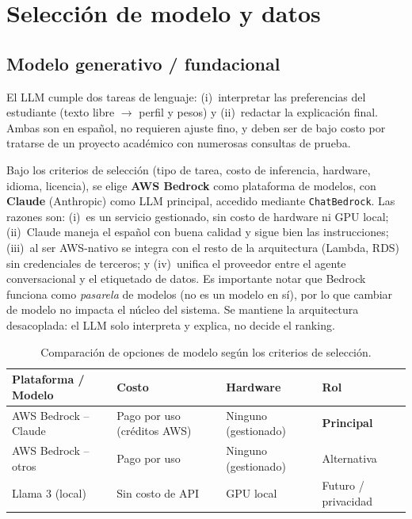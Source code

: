 \section{Selecci\'on de modelo y datos}
\label{sec:model-data}

\subsection{Modelo generativo / fundacional}

El LLM cumple dos tareas de lenguaje: (i)~interpretar las preferencias del
estudiante (texto libre $\rightarrow$ perfil y pesos) y (ii)~redactar la
explicaci\'on final. Ambas son en espa\~nol, no requieren ajuste fino, y deben
ser de bajo costo por tratarse de un proyecto acad\'emico con numerosas consultas
de prueba.

Bajo los criterios de selecci\'on (tipo de tarea, costo de inferencia, hardware,
idioma, licencia), se elige \textbf{AWS Bedrock} como plataforma de modelos, con
\textbf{Claude} (Anthropic) como LLM principal, accedido mediante
\texttt{ChatBedrock}. Las razones son: (i)~es un servicio gestionado, sin costo de
hardware ni GPU local; (ii)~Claude maneja el espa\~nol con buena calidad y sigue
bien las instrucciones; (iii)~al ser AWS-nativo se integra con el resto de la
arquitectura (Lambda, RDS) sin credenciales de terceros; y (iv)~unifica el
proveedor entre el agente conversacional y el etiquetado de datos. Es importante
notar que Bedrock funciona como \emph{pasarela} de modelos (no es un modelo en
s\'i), por lo que cambiar de modelo no impacta el n\'ucleo del sistema. Se
mantiene la arquitectura desacoplada: el LLM solo interpreta y explica, no decide
el ranking.

\begin{table}[H]
\centering
\begin{tabularx}{\linewidth}{@{} >{\raggedright\arraybackslash}p{3.1cm} X >{\raggedright\arraybackslash}p{2.6cm} >{\raggedright\arraybackslash}p{2.6cm} @{}}
\toprule
\textbf{Plataforma / Modelo} & \textbf{Costo} & \textbf{Hardware} & \textbf{Rol} \\
\midrule
AWS Bedrock -- Claude & Pago por uso (cr\'editos AWS) & Ninguno (gestionado) & \textbf{Principal} \\
AWS Bedrock -- otros  & Pago por uso                  & Ninguno (gestionado) & Alternativa \\
Llama 3 (local)       & Sin costo de API              & GPU local            & Futuro / privacidad \\
\bottomrule
\end{tabularx}
\caption{Comparaci\'on de opciones de modelo seg\'un los criterios de selecci\'on.}
\label{tab:model-comparison}
\end{table}

